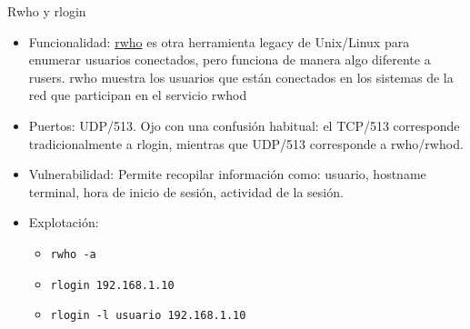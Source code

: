 \documentclass[aspectratio=169,11pt]{beamer}
\newcommand{\cmd}[1]{\texttt{#1}}
\begin{document}
\begin{frame}[allowframebreaks]{Rwho y rlogin}
\small
  \begin{itemize}
  \item Funcionalidad: \href{https://man7.org/linux/man-pages/man1/rwho.1.html}{rwho} es otra herramienta legacy de Unix/Linux para enumerar usuarios conectados, pero funciona de manera algo diferente a rusers. rwho muestra los usuarios que están conectados en los sistemas de la red que participan en el servicio rwhod
  \item Puertos: UDP/513. Ojo con una confusión habitual: el TCP/513 corresponde tradicionalmente a rlogin, mientras que UDP/513 corresponde a rwho/rwhod.
  \item Vulnerabilidad: Permite recopilar información como: usuario, hostname terminal, hora de inicio de sesión, actividad de la sesión.
  \item Explotación:
    \begin{itemize}
      \item \cmd{rwho -a}
      \item \cmd{rlogin 192.168.1.10}
      \item \cmd{rlogin -l usuario 192.168.1.10}
    \end{itemize}
  \end{itemize}
\end{frame}

\end{document}

